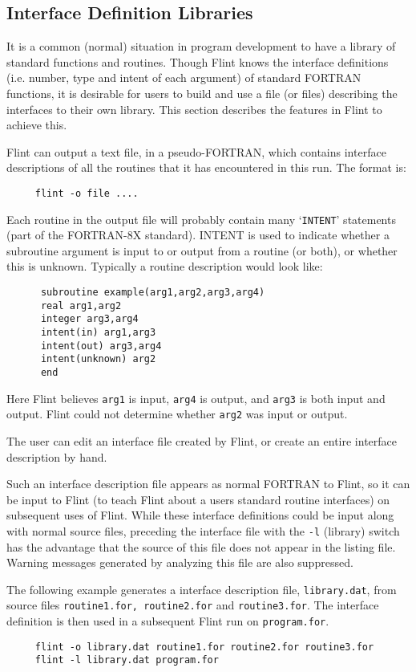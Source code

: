 \documentclass{report}
\begin{document}
\subsection{Interface Definition Libraries}
It is a common (normal) situation in program development to have a library
of standard functions and routines. Though Flint knows the interface
definitions (i.e. number, type and intent of each argument) of standard
FORTRAN
functions, it is desirable for users to build and use a file (or
files) describing the interfaces to their own library. This section describes
the features in Flint to achieve this.

Flint can output a text file, in a pseudo-FORTRAN, which contains interface
descriptions of all the routines that it has encountered in this run. The
format is:
\begin{verbatim}
     flint -o file ....
\end{verbatim}
Each routine in the output file will probably contain many `{\tt INTENT}'
statements (part of the FORTRAN-8X standard). INTENT is used to indicate
whether a
subroutine argument is input to or output from a routine (or both),
or whether this is unknown. Typically a routine description would look
like:
\begin{verbatim}
      subroutine example(arg1,arg2,arg3,arg4)
      real arg1,arg2
      integer arg3,arg4
      intent(in) arg1,arg3
      intent(out) arg3,arg4
      intent(unknown) arg2
      end
\end{verbatim}
Here Flint believes {\tt arg1} is input, {\tt arg4} is output, and {\tt arg3}
is both input and output. Flint could not determine whether {\tt arg2} was
input or output.

The user can edit an interface file created by Flint, or create an
entire interface description by hand.

Such an interface description file appears as normal FORTRAN to Flint, so it
can be input to Flint (to teach Flint about a users standard routine interfaces)
on subsequent uses of Flint. While these interface definitions could
be input along with normal source files, preceding the interface file with
the {\tt -l} (library) switch has the advantage that the source of this
file does not appear in the listing file. Warning messages generated by
analyzing this file are also suppressed.

The following example generates a interface description file, {\tt library.dat},
from source files {\tt routine1.for, routine2.for} and {\tt routine3.for}.
The interface definition is then used in a subsequent Flint run on
{\tt program.for}.
\begin{verbatim}
     flint -o library.dat routine1.for routine2.for routine3.for
     flint -l library.dat program.for
\end{verbatim}
\end{document}
